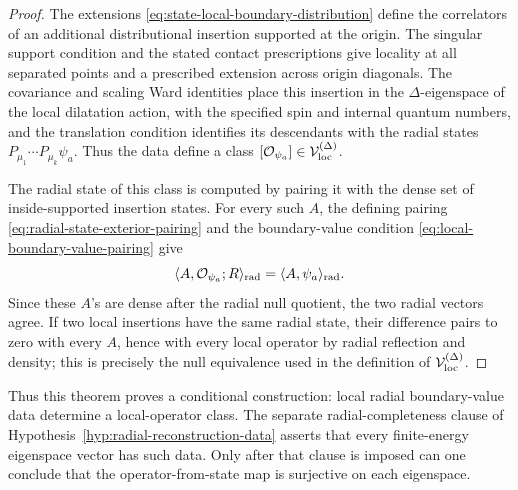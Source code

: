 \begin{proof}
The extensions
\eqref{eq:state-local-boundary-distribution} define the correlators of an
additional distributional insertion supported at the origin.  The singular
support condition and the stated contact prescriptions give locality at all
separated points and a prescribed extension across origin diagonals.  The
covariance and scaling Ward identities place this insertion in the
\(\Delta\)-eigenspace of the local dilatation action, with the specified spin
and internal quantum numbers, and the translation condition identifies its
descendants with the radial states \(P_{\mu_1}\cdots P_{\mu_k}\psi_a\).
Thus the data define a class
\([\mathcal O_{\psi_a}]\in\mathcal V_{\rm loc}^{(\Delta)}\).

The radial state of this class is computed by pairing it with the dense set of
inside-supported insertion states.  For every such \(A\), the defining
pairing \eqref{eq:radial-state-exterior-pairing} and the boundary-value
condition \eqref{eq:local-boundary-value-pairing} give
\[
  \langle A,\mathcal O_{\psi_a};R\rangle_{\rm rad}
  =
  \langle A,\psi_a\rangle_{\rm rad}.
\]
Since these \(A\)'s are dense after the radial null quotient, the two radial
vectors agree.  If two local insertions have the same radial state, their
difference pairs to zero with every \(A\), hence with every local operator by
radial reflection and density; this is precisely the null equivalence used in
the definition of \(\mathcal V_{\rm loc}^{(\Delta)}\).
\end{proof}

Thus this theorem proves a conditional construction: local radial
boundary-value data determine a local-operator class.  The separate
radial-completeness clause of Hypothesis~\ref{hyp:radial-reconstruction-data}
asserts that every finite-energy eigenspace vector has such data.  Only after
that clause is imposed can one conclude that the operator-from-state map is
surjective on each eigenspace.

